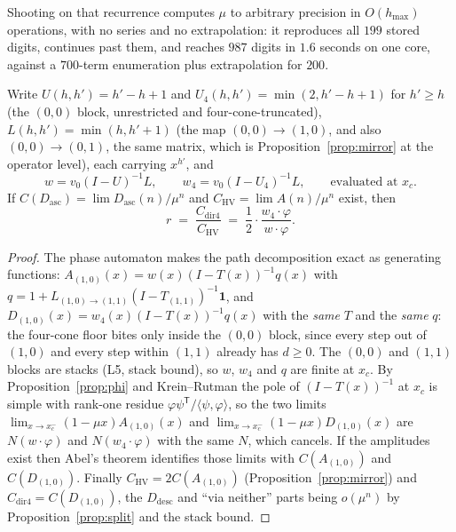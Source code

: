 \documentclass[11pt]{article}
\newcommand{\HV}{\mathrm{HV}}
\begin{document}
Shooting on that recurrence computes $\mu$ to arbitrary precision in
$O(h_{\max})$ operations, with no series and no extrapolation: it reproduces
all $199$ stored digits, continues past them, and reaches $987$ digits in
$1.6$ seconds on one core, against a $700$-term enumeration plus extrapolation
for $200$.

\begin{proposition}
\label{prop:ratio}
Write $U(h,h') = h'-h+1$ and $U_4(h,h') = \min(2, h'-h+1)$ for $h' \ge h$ (the
$(0,0)$ block, unrestricted and four-cone-truncated), $L(h,h') = \min(h,h'{+}1)$
(the map $(0,0)\to(1,0)$, and also $(0,0)\to(0,1)$, the same matrix, which is
Proposition~\ref{prop:mirror} at the operator level), each carrying $x^{h'}$,
and
\[
  w = v_0(I-U)^{-1}L, \qquad w_4 = v_0(I-U_4)^{-1}L,
  \qquad\text{evaluated at } x_c .
\]
If $C(D_{\mathrm{asc}}) = \lim D_{\mathrm{asc}}(n)/\mu^n$ and
$C_{\HV} = \lim A(n)/\mu^n$ exist, then
\begin{equation}
  r \;=\; \frac{C_{\text{dir4}}}{C_{\HV}}
    \;=\; \frac12\cdot\frac{w_4\cdot\varphi}{w\cdot\varphi} .
  \label{eq:ratio}
\end{equation}
\end{proposition}

\begin{proof}
The phase automaton makes the path decomposition exact as generating functions:
$A_{(1,0)}(x) = w(x)(I-T(x))^{-1}q(x)$ with
$q = 1 + L_{(1,0)\to(1,1)}(I-T_{(1,1)})^{-1}\mathbf 1$, and
$D_{(1,0)}(x) = w_4(x)(I-T(x))^{-1}q(x)$ with the \emph{same} $T$ and the
\emph{same} $q$: the four-cone floor bites only inside the $(0,0)$ block,
since every step out of $(1,0)$ and every step within $(1,1)$ already has
$d \ge 0$. The $(0,0)$ and $(1,1)$ blocks are stacks
(L5, stack bound), so $w$, $w_4$ and $q$ are finite at $x_c$. By
Proposition~\ref{prop:phi} and Krein--Rutman the pole of $(I-T(x))^{-1}$ at
$x_c$ is simple with rank-one residue $\varphi\psi^{\mathsf T}/\langle\psi,
\varphi\rangle$, so the two limits
$\lim_{x\to x_c^-}(1-\mu x)A_{(1,0)}(x)$ and
$\lim_{x\to x_c^-}(1-\mu x)D_{(1,0)}(x)$ are $N(w\cdot\varphi)$ and
$N(w_4\cdot\varphi)$ with the same $N$, which cancels. If the amplitudes exist
then Abel's theorem identifies those limits with $C(A_{(1,0)})$ and
$C(D_{(1,0)})$. Finally $C_{\HV} = 2C(A_{(1,0)})$
(Proposition~\ref{prop:mirror}) and $C_{\text{dir4}} = C(D_{(1,0)})$, the
$D_{\mathrm{desc}}$ and ``via neither'' parts being $o(\mu^n)$ by
Proposition~\ref{prop:split} and the stack bound.
\end{proof}
\end{document}
